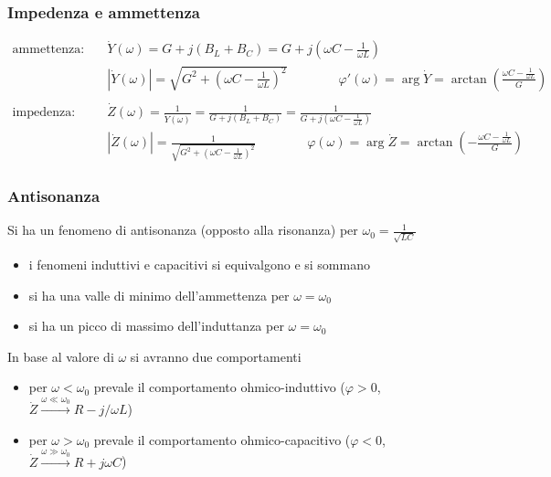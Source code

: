 \documentclass[a4paper]{article}
\begin{document}
\subsubsection*{Impedenza e ammettenza}
\begin{align*}
	\text{ammettenza:} \quad &\dot{Y}(\omega) = G + j(B_L + B_C) = G + j\left(\omega C - \frac{1}{\omega L}\right) \\
	&\left|\dot{Y}(\omega)\right| = \sqrt{G^2 + \left(\omega C - \frac{1}{\omega L}\right)^2} \qquad\qquad \varphi'(\omega) = \arg \dot{Y} = \arctan \left(\frac{\omega C - \frac{1}{\omega L}}{G}\right) \\
	& \\
	\text{impedenza:} \quad &\dot{Z}(\omega) = \frac{1}{\dot{Y}(\omega)} = \frac{1}{G + j(B_L + B_C)} = \frac{1}{G + j\left(\omega C - \frac{1}{\omega L}\right)} \\
	&\left|\dot{Z}(\omega)\right| = \frac{1}{\sqrt{G^2 + \left(\omega C - \frac{1}{\omega L}\right)^2}} \qquad\qquad \varphi(\omega) = \arg \dot{Z} = \arctan \left(-\frac{\omega C - \frac{1}{\omega L}}{G}\right)
\end{align*}

\newpage

\subsubsection*{Antisonanza}
Si ha un fenomeno di antisonanza (opposto alla risonanza) per \(\omega_0 = \frac{1}{\sqrt{LC}}\)
\begin{itemize}
	\item i fenomeni induttivi e capacitivi si equivalgono e si sommano
	\item si ha una valle di minimo dell'ammettenza per \(\omega = \omega_0\)
	\item si ha un picco di massimo dell'induttanza per \(\omega = \omega_0\)
\end{itemize}
In base al valore di \(\omega\) si avranno due comportamenti
\begin{itemize}
	\item per \(\omega < \omega_0\) prevale il comportamento ohmico-induttivo (\(\varphi > 0\), \(\dot{Z} \stackrel{\omega \ll \omega_0}{\longrightarrow} R - j / \omega L\))
	\item per \(\omega > \omega_0\) prevale il comportamento ohmico-capacitivo (\(\varphi < 0\), \(\dot{Z} \stackrel{\omega \gg \omega_0}{\longrightarrow} R + j\omega C\))
\end{itemize}
\end{document}
